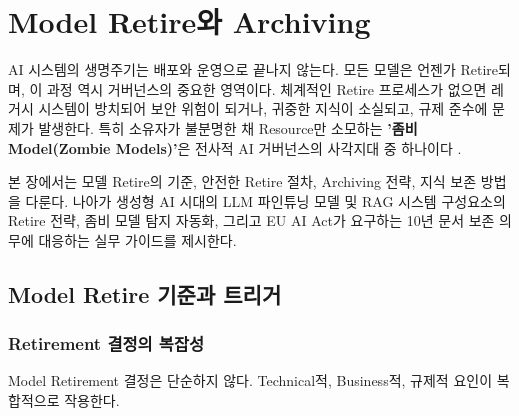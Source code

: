 
\chapter{Model Retire와 Archiving}
\label{ch:model_retirement}

AI 시스템의 생명주기는 배포와 운영으로 끝나지 않는다\cite{kreuzberger2023machine}. 모든 모델은 언젠가 Retire되며, 이 과정 역시 거버넌스의 중요한 영역이다. 체계적인 Retire 프로세스\cite{ashmore2021assuring}가 없으면 레거시 시스템이 방치되어 보안 위험이 되거나, 귀중한 지식이 소실되고, 규제 준수에 문제가 발생\cite{mokander2022conformity}한다. 특히 소유자가 불분명한 채 Resource만 소모하는 \textbf{'좀비 Model(Zombie Models)'}은 전사적 AI 거버넌스의 사각지대 중 하나이다 \cite{sculley2015hidden}.

본 장에서는 모델 Retire의 기준, 안전한 Retire 절차, Archiving 전략, 지식 보존\cite{sato2019continuous} 방법을 다룬다. 나아가 생성형 AI 시대의 LLM\cite{bommasani2021opportunities} 파인튜닝 모델 및 RAG\cite{lewis2020retrieval} 시스템 구성요소의 Retire 전략, 좀비 모델\cite{tamburri2020sustainable} 탐지 자동화, 그리고 EU AI Act가 요구하는 10년 문서 보존\cite{ebers2021european} 의무에 대응하는 실무 가이드를 제시한다.

\section{Model Retire 기준과 트리거}
\label{sec:12.1}

\subsection{Retirement 결정의 복잡성}
\label{sec:12.1.1}

Model Retirement 결정은 단순하지 않다. Technical적, Business적, 규제적 요인이 복합적으로 작용한다.


